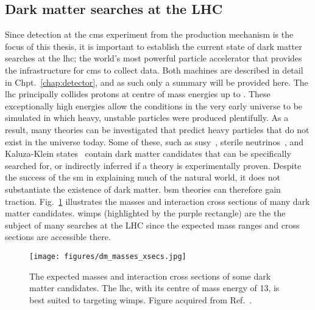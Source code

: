 

\subsection{Dark matter searches at the LHC}
\label{subsec:dm_searches_lhc}

Since detection at the \acrshort{cms} experiment from the production mechanism is the focus of this thesis, it is important to establish the current state of dark matter searches at the \acrfull{lhc}; the world's most powerful particle accelerator that provides the infrastructure for \acrshort{cms} to collect data. Both machines are described in detail in Chpt.~\ref{chap:detector}, and as such only a summary will be provided here. The \acrshort{lhc} principally collides protons at centre of mass energies up to \comruntwo. These exceptionally high energies allow the conditions in the very early universe to be simulated in which heavy, unstable particles were produced plentifully. As a result, many theories can be investigated that predict heavy particles that do not exist in the universe today. Some of these, such as \acrfull{susy}~\cite{Martin:1997ns}, sterile neutrinos~\cite{doi:10.1142/S0218301313300191}, and Kaluza-Klein states~\cite{Han:1998sg} contain dark matter candidates that can be specifically searched for, or indirectly inferred if a theory is experimentally proven. Despite the success of the \acrlong{sm} in explaining much of the natural world, it does not substantiate the existence of dark matter. \acrshort{bsm} theories can therefore gain traction. Fig.~\ref{fig:dm_masses_xsecs} illustrates the masses and interaction cross sections of many dark matter candidates. \Glspl{wimp} (highlighted by the purple rectangle) are the the subject of many searches at the LHC since the expected mass ranges and cross sections are accessible there.

\begin{figure}[htbp]
    \centering
    \texttt{[image: figures/dm\_masses\_xsecs.jpg]}
    \caption[The expected masses and interaction cross sections of some dark matter candidates. The \acrshort{lhc}, with its centre of mass energy of 13\TeV, is best suited to targeting WIMPs]{The expected masses and interaction cross sections of some dark matter candidates. The \acrshort{lhc}, with its centre of mass energy of 13\TeV, is best suited to targeting \glspl{wimp}. Figure acquired from Ref.~.}
    \label{fig:dm_masses_xsecs}
\end{figure}

